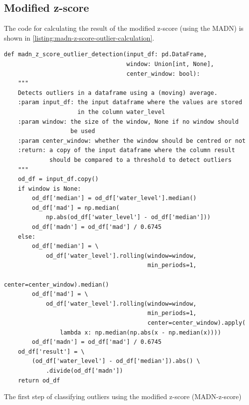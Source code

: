 \subsection{Modified z-score}
The code for calculating the result of the modified z-score (using the \ac{MADN}) is shown in \autoref{listing:madn-z-score-outlier-calculation}.
\begin{listing}
\begin{verbatim}
def madn_z_score_outlier_detection(input_df: pd.DataFrame,
                                   window: Union[int, None],
                                   center_window: bool):
    """
    Detects outliers in a dataframe using a (moving) average.
    :param input_df: the input dataframe where the values are stored
                     in the column water_level
    :param window: the size of the window, None if no window should
                   be used
    :param center_window: whether the window should be centred or not
    :return: a copy of the input dataframe where the column result
             should be compared to a threshold to detect outliers
    """
    od_df = input_df.copy()
    if window is None:
        od_df['median'] = od_df['water_level'].median()
        od_df['mad'] = np.median(
            np.abs(od_df['water_level'] - od_df['median']))
        od_df['madn'] = od_df['mad'] / 0.6745
    else:
        od_df['median'] = \
            od_df['water_level'].rolling(window=window,
                                         min_periods=1,
                                         center=center_window).median()
        od_df['mad'] = \
            od_df['water_level'].rolling(window=window,
                                         min_periods=1,
                                         center=center_window).apply(
                lambda x: np.median(np.abs(x - np.median(x))))
        od_df['madn'] = od_df['mad'] / 0.6745
    od_df['result'] = \
        (od_df['water_level'] - od_df['median']).abs() \
            .divide(od_df['madn'])
    return od_df
\end{verbatim}
\caption{The first step of classifying outliers using the modified z-score (\ac{MADN}-z-score)}
\label{listing:madn-z-score-outlier-calculation}
\end{listing}

